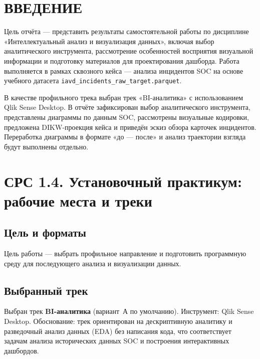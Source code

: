 \documentclass[12pt]{extreport}
\begin{document}
	\section*{ВВЕДЕНИЕ}
	
	Цель отчёта --- представить результаты самостоятельной работы по дисциплине «Интеллектуальный анализ и визуализация данных», включая выбор аналитического инструмента, рассмотрение особенностей восприятия визуальной информации и подготовку материалов для проектирования дашборда. Работа выполняется в рамках сквозного кейса --- анализа инцидентов SOC на основе учебного датасета \texttt{iavd\_incidents\_raw\_target.parquet}.
	
	В качестве профильного трека выбран трек «BI-аналитика» с использованием Qlik Sense Desktop. В отчёте зафиксирован выбор аналитического инструмента, представлены диаграммы по данным SOC, рассмотрены визуальные кодировки, предложена DIKW-проекция кейса и приведён эскиз обзора карточек инцидентов. Переработка диаграммы в формате «до --- после» и анализ траектории взгляда будут выполнены отдельно.

    \newpage
	\section{СРС 1.4. Установочный практикум: рабочие места и треки}
	
	\subsection{Цель и форматы}
	
	Цель работы --- выбрать профильное направление и подготовить программную среду для последующего анализа и визуализации данных.
	
	\subsection{Выбранный трек}
	
	Выбран трек \textbf{BI-аналитика} (вариант~А по умолчанию). Инструмент: Qlik Sense Desktop. Обоснование: трек ориентирован на дескриптивную аналитику и разведочный анализ данных (EDA) без написания кода, что соответствует задачам анализа исторических данных SOC и построения интерактивных дашбордов.
	
\end{document}
